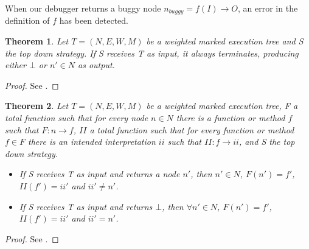 \begin{definition}
When our debugger returns a buggy node \(n_{buggy} = f(I) \to O\), an error in the definition of \(f\) has been detected. 
\end{definition}
\newtheorem{theorem}{Theorem}
\begin{theorem}
Let \(T = (N,E,W,M)\) be a weighted marked execution tree and S the top down strategy.
If S receives T as input, it always terminates, producing either \(\bot\) or \(n'\in N\) as output. 
\end{theorem}
\begin{proof}
See \cite{DeclarativeErrorDiagnosis}.
\end{proof}
\begin{theorem}
Let \(T = (N,E,W,M)\) be a weighted marked execution tree, F a total function such that for every node \(n\in N\) there is a function or method \(f\) such that \(F:n\to f\), \(II\) a total function such that for every function or method \(f\in F\) there is an intended interpretation \(ii\) such that \(II:f\to ii\), and S the top down strategy.
\begin{itemize}
    \item If S receives T as input and returns a node \(n'\), then \(n'\in N\), \(F(n') = f'\), \(II(f') = ii'\) and \(ii'\neq n'\).
    \item If S receives T as input and returns \(\bot\), then \(\forall n'\in N\), \(F(n') = f'\), \(II(f') = ii'\) and \(ii' = n'\).
\end{itemize}
\end{theorem}
\begin{proof}
See \cite{DeclarativeErrorDiagnosis}.
\end{proof}

